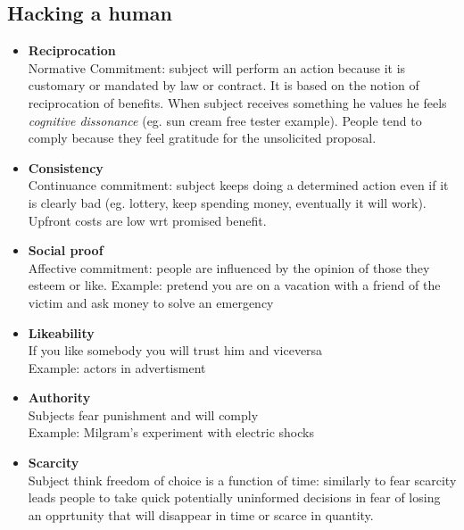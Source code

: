 \documentclass[10pt,a4paper]{book}
\begin{document}
\subsection{Hacking a human}
\begin{itemize}
\item \textbf{Reciprocation}\\
Normative Commitment: subject will perform an action because it is customary or mandated by law or contract. It is based on the notion of reciprocation of benefits. When subject receives something he values he feels \emph{cognitive dissonance} (eg. sun cream free tester example). People tend to comply because they feel gratitude for the unsolicited proposal.
\item \textbf{Consistency}\\
Continuance commitment: subject keeps doing a determined action even if it is clearly bad (eg. lottery, keep spending money, eventually it will work).\\
Upfront costs are low wrt promised benefit.
\item \textbf{Social proof}\\
Affective commitment: people are influenced by the opinion of those they esteem or like. Example: pretend you are on a vacation with a friend of the victim and ask money to solve an emergency
\item \textbf{Likeability}\\
If you like somebody you will trust him and viceversa\\
Example: actors in advertisment
\item \textbf{Authority}\\
Subjects fear punishment and will comply\\
Example: Milgram's experiment with electric shocks
\item \textbf{Scarcity}\\
Subject think freedom of choice is a function of time: similarly to fear scarcity leads people to take quick potentially uninformed decisions in fear of losing an opprtunity that will disappear in time or scarce in quantity. 
\end{itemize}
\end{document}
